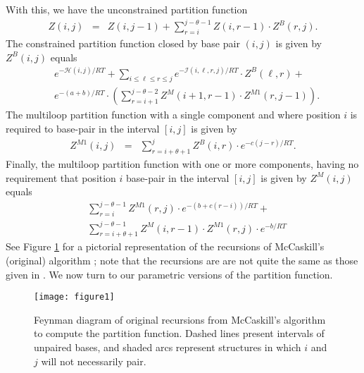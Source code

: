 With this, we have the unconstrained partition function
\begin{eqnarray}
Z(i,j) &= &Z(i,j-1) + \sum_{r=i}^{j-\theta-1} Z(i,r-1) \cdot Z^B(r,j).
\end{eqnarray}
The constrained partition function closed by base pair $(i,j)$ is
given by
$Z^B(i,j)$ equals
\begin{eqnarray}
&e^{-\mathcal{H}(i,j)/RT} +
\displaystyle\sum_{i \leq \ell \leq r \leq j}
e^{-\mathcal{I}(i,\ell,r,j)/RT}\cdot Z^B(\ell,r) +\\
& e^{-(a+b)/RT} \cdot \left( \sum_{r=i+1}^{j-\theta-2} Z^M(i+1,r-1)
\cdot Z^{M1}(r,j-1) \right). \nonumber
\end{eqnarray}
The multiloop partition function with a single component and where
position $i$ is required to base-pair in the interval $[i,j]$ is given
by
\begin{eqnarray}
Z^{M1}(i,j) &= &
\displaystyle\sum_{r=i+\theta+1}^j Z^B(i,r) \cdot
e^{-c(j-r)/RT} .
\end{eqnarray}
Finally, the multiloop partition function with one or more components,
having no requirement that position $i$ base-pair in the interval $[i,j]$
is given by $Z^{M}(i,j)$ equals
\begin{eqnarray}
&
\displaystyle\sum_{r=i}^{j-\theta-1}  Z^{M1}(r,j) \cdot
e^{-(b+c(r-i))/RT}  + \\
&\displaystyle\sum_{r=i+\theta+1}^{j-\theta-1}  Z^{M}(i,r-1) \cdot
Z^{M1}(r,j) \cdot e^{-b/RT}  \nonumber
\end{eqnarray}
See Figure \ref{fig:feynmanDiagram} for a pictorial representation
of the recursions of McCaskill's (original) algorithm \cite{mcCaskill};
note that the recursions are are not quite the same
as those given in \cite{hofacker:FastFolding}.
We now turn to our parametric versions of the partition function.

\begin{figure}[htp]
\centerline{\texttt{[image: figure1]}}
\caption{Feynman diagram of original recursions from McCaskill's
algorithm \cite{mcCaskill} to compute the partition function.
Dashed lines present intervals of unpaired bases, and shaded
arcs represent structures in which $i$ and $j$ will not necessarily pair.
}
\label{fig:feynmanDiagram}
\end{figure}


